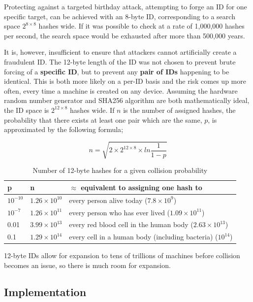 \documentclass{article}
\begin{document}
Protecting against a targeted birthday attack, attempting to forge an ID for one specific target, can be achieved with an 8-byte ID, corresponding to a search space \( 2^{8 \times 8} \) hashes wide. If it was possible to check at a rate of 1,000,000 hashes per second, the search space would be exhausted after more than 500,000 years.

It is, however, insufficient to ensure that attackers cannot artificially create a fraudulent ID. The 12-byte length of the ID was not chosen to prevent brute forcing of a \textbf{specific ID}, but to prevent any \textbf{pair of IDs} happening to be identical. This is both more likely on a per-ID basis and the risk comes up more often, every time a machine is created on any device. Assuming the hardware random number generator and SHA256 algorithm are both mathematically ideal, the ID space is \( 2^{12 \times 8} \) hashes wide. If \( n \) is the number of assigned hashes, the probability that there exists at least one pair which are the same, \( p \), is approximated by the following formula\cite{birth};

\[ n = \sqrt{2 \times 2^{12 \times 8} \times ln\frac{1}{1-p}}\]

\begin{table}[H]
\begin{tabular}{l|l|l}
p				&n							&\( \approx \) equivalent to assigning one hash to \\ \hline
\( 10^{-10}\)	&\( 1.26 \times 10^{10}\)	& every person alive today (\( 7.8 \times 10^{9}\))\\
\( 10^{-7}\)	&\( 1.26 \times 10^{11}\)	& every person who has ever lived (\( 1.09 \times 10^{11}\)) \\
0.01			&\( 3.99 \times 10^{13}\)	& every red blood cell in the human body (\( 2.63 \times 10^{13}\)) \\
0.1				&\( 1.29 \times 10^{14}\)	& every cell in a human body (including bacteria) (\( 10^{14}\))

\end{tabular}
\caption{Number of 12-byte hashes for a given collision probability}
\end{table}

12-byte IDs allow for expansion to tens of trillions of machines before collision becomes an issue, so there is much room for expansion.

\subsection{Implementation}
\end{document}
